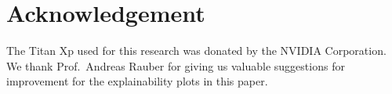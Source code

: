 \documentclass[10pt,sigconf,letterpaper,dvipsnames]{acmart}
\begin{document}
\section*{Acknowledgement}
The Titan Xp used for this research was donated by the NVIDIA Corporation. We thank Prof.~Andreas Rauber for giving us valuable suggestions for improvement for the explainability plots in this paper.



%




%
%
\end{document}

